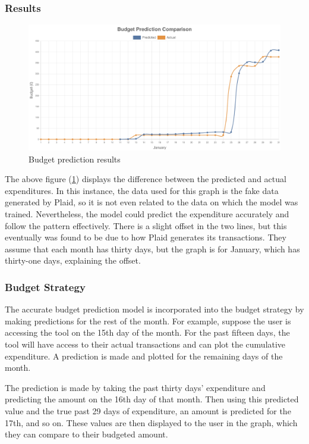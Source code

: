 \subsubsection{Results}
\begin{figure}[H]
	\centering
	\includegraphics[width=\textwidth]{images/budget_prediction_comparison.png}
	\caption{Budget prediction results}
	\label{fig:BudgetPredictionResults}
\end{figure}

The above figure (\ref{fig:BudgetPredictionResults}) displays the difference between the predicted and actual expenditures. In this instance, the data used for this graph is the fake data generated by Plaid, so it is not even related to the data on which the model was trained. Nevertheless, the model could predict the expenditure accurately and follow the pattern effectively. There is a slight offset in the two lines, but this eventually was found to be due to how Plaid generates its transactions. They assume that each month has thirty days, but the graph is for January, which has thirty-one days, explaining the offset.

\subsubsection{Budget Strategy}
The accurate budget prediction model is incorporated into the budget strategy by making predictions for the rest of the month. For example, suppose the user is accessing the tool on the 15th day of the month. For the past fifteen days, the tool will have access to their actual transactions and can plot the cumulative expenditure. A prediction is made and plotted for the remaining days of the month.

The prediction is made by taking the past thirty days' expenditure and predicting the amount on the 16th day of that month. Then using this predicted value and the true past 29 days of expenditure, an amount is predicted for the 17th, and so on. These values are then displayed to the user in the graph, which they can compare to their budgeted amount.

